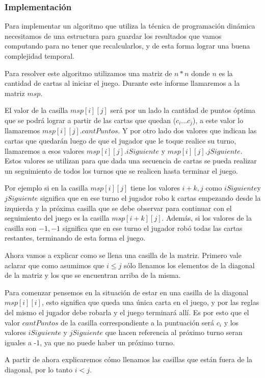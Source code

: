 \subsubsection{Implementación}

Para implementar un algoritmo que utiliza la técnica de programación dinámica necesitamos de una estructura para guardar los resultados que vamos computando para no tener que recalcularlos, y de esta forma lograr una buena complejidad temporal.

Para resolver este algoritmo utilizamos una matriz de $n * n$ donde $n$ es la cantidad de cartas al iniciar el juego. Durante este informe llamaremos a la matriz $msp$.

El valor de la casilla $msp[i][j]$ será por un lado la cantidad de puntos óptima que se podrá lograr a partir de las cartas que quedan ($c_i ... c_j$), a este valor lo llamaremos $msp[i][j].cantPuntos$. Y por otro lado dos valores que indican las cartas que quedarán luego de que el jugador que le toque realice su turno, llamaremos a esos valores $msp[i][j].iSiguiente$ y $msp[i][j].jSiguiente$. Estos valores se utilizan para que dada una secuencia de cartas se pueda realizar un seguimiento de todos los turnos que se realicen hasta terminar el juego.

Por ejemplo si en la casilla $msp[i][j]$ tiene los valores $i+k, j$ como $iSiguiente $y$ jSiguiente$ significa que en ese turno el jugador robo k cartas empezando desde la izquierda y la próxima casilla que se debe observar para continuar con el seguimiento del juego es la casilla $msp[i+k][j]$. Además, si los valores de la casilla son $-1, -1$ significa que en ese turno el jugador robó todas las cartas restantes, terminando de esta forma el juego.

Ahora vamos a explicar como se llena una casilla de la matriz. Primero vale aclarar que como asumimos que $i \leq j$ sólo llenamos los elementos de la diagonal de la matriz y los que se encuentran arriba de la misma.

Para comenzar pensemos en la situación de estar en una casilla de la diagonal $msp[i][i]$, esto significa que queda una única carta en el juego, y por las reglas del mismo el jugador debe robarla y el juego terminará allí. Es por esto que el valor $cantPuntos$ de la casilla correspondiente a la puntuación será $c_i$ y los valores $iSiguiente$ y $jSiguiente$ que hacen referencia al próximo turno seran iguales a -1, ya que no puede haber un próximo turno.

A partir de ahora explicaremos cómo llenamos las casillas que están fuera de la diagonal, por lo tanto $i < j$.


